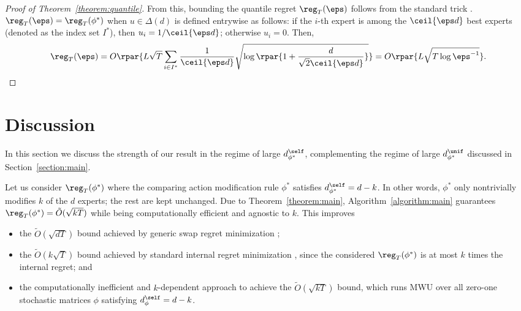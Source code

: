 \documentclass[10pt]{article}
\begin{document}
\begin{proof}[Proof of Theorem~\ref{theorem:quantile}]
From this, bounding the quantile regret $\reg_T(\eps)$ follows from the standard trick \citep[Remark~9.16]{orabona2023modern}. $\reg_T(\eps)=\reg_T(\phi^*)$ when $u\in\Delta(d)$ is defined entrywise as follows: if the $i$-th expert is among the $\ceil{\eps d}$ best experts (denoted as the index set $I^*$), then $u_i=1/\ceil{\eps d}$; otherwise $u_i=0$. Then, 
\begin{equation*}
\reg_T(\eps)=O\rpar{L\sqrt{T}\sum_{i\in I^*}\frac{1}{\ceil{\eps d}}\sqrt{\log\rpar{1+\frac{d}{\sqrt{2}\ceil{\eps d}}}}}=O\rpar{L\sqrt{T\log \eps^{-1}}}.\qedhere
\end{equation*}
\end{proof}

\section{Discussion}\label{section:discussion}

In this section we discuss the strength of our result in the regime of large $d^\self_{\phi^*}$, complementing the regime of large $d^\unif_{\phi^*}$ discussed in Section~\ref{section:main}. 

Let us consider $\reg_T(\phi^*)$ where the comparing action modification rule $\phi^*$ satisfies $d^\self_{\phi^*}=d-k$. In other words, $\phi^*$ only nontrivially modifies $k$ of the $d$ experts; the rest are kept unchanged. Due to Theorem~\ref{theorem:main}, Algorithm~\ref{algorithm:main} guarantees $\reg_T(\phi^*)=\tilde O(\sqrt{kT})$ while being computationally efficient and agnostic to $k$. This improves
\begin{itemize}
\item the $\tilde O(\sqrt{dT})$ bound achieved by generic swap regret minimization \citep{blum2007external};
\item the $\tilde O(k\sqrt{T})$ bound achieved by standard internal regret minimization \citep[Chapter~4.4]{cesa2006prediction}, since the considered $\reg_T(\phi^*)$ is at most $k$ times the internal regret; and
\item the computationally inefficient and $k$-dependent approach to achieve the $\tilde O(\sqrt{kT})$ bound, which runs MWU over all zero-one stochastic matrices $\phi$ satisfying $d^\self_{\phi}=d-k$. 
\end{itemize}
\end{document}
